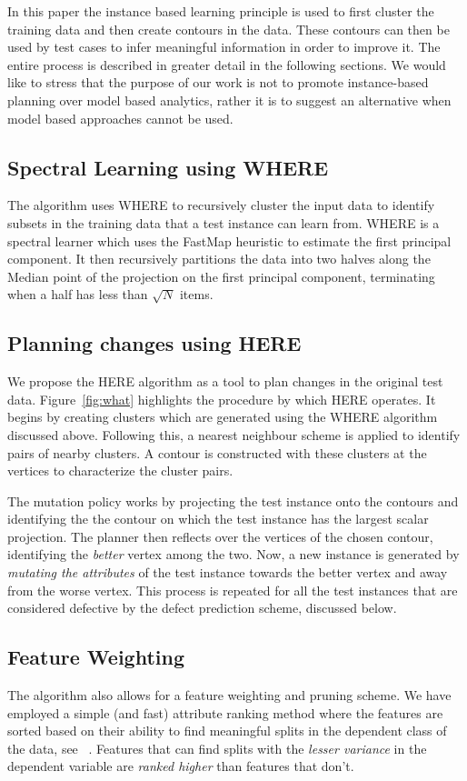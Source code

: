 \documentclass[conference]{IEEEtran}
\begin{document}
{In this paper the instance based learning principle is used to first cluster the training data and then create contours in the data. These contours can then be used by test cases to infer meaningful information in order to improve it. The entire process is described in greater detail in the following sections. We would like to stress that the purpose of our work is not to promote instance-based planning over model based analytics, rather it is to suggest an alternative when model based approaches cannot be used.

\subsection{Spectral Learning using WHERE}
The algorithm uses WHERE to recursively cluster the input data to identify subsets in the training data that a test instance can learn from. WHERE is a spectral learner which uses the FastMap heuristic to estimate the first principal component. It then recursively partitions the data into two halves along the Median point of the projection on the first principal component, terminating when a half has less than $\sqrt{N}$ items.   

\subsection{Planning changes using HERE}
We propose the HERE algorithm as a tool to plan changes in the original test data. Figure~\ref{fig:what} highlights the procedure by which HERE operates. It begins by creating clusters which are generated using the WHERE algorithm discussed above. Following this, a nearest neighbour scheme is applied to identify pairs of nearby clusters. A contour is constructed with these clusters at the vertices to characterize the cluster pairs.

The mutation policy works by projecting the test instance onto the contours and identifying the the contour on which the test instance has the largest scalar projection. The planner then reflects over the vertices of the chosen contour, identifying the \textit{better} vertex among the two. Now, a new instance is generated by \textit{mutating the attributes} of the test instance towards the better vertex and away from the worse vertex. This process is repeated for all the test instances that are considered defective by the defect prediction scheme, discussed below.

\subsection{Feature Weighting} \label{fwt}
The algorithm also allows for a feature weighting and pruning scheme. We have employed a simple (and fast) attribute ranking method where the features are sorted based on their ability to find meaningful splits in the dependent class of the data, see ~\cite{hall03}. Features that can find splits with the \textit{lesser variance} in the dependent variable are \textit{ranked higher} than features that don't. 

}
\end{document}

